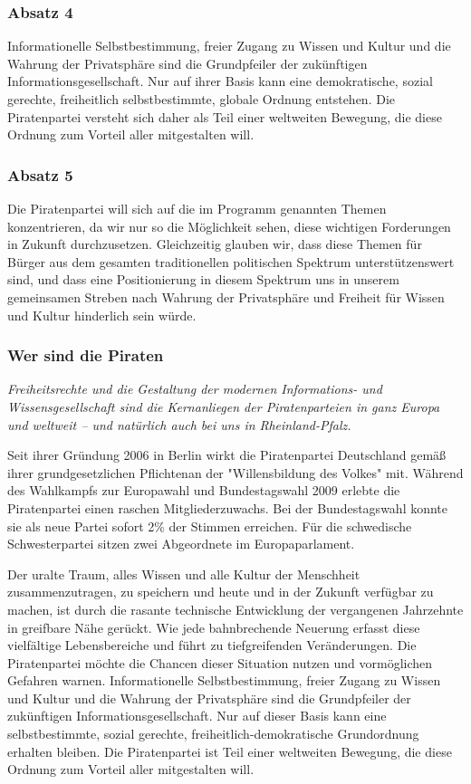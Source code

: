 \subsubsection{Absatz 4}
\abstimmung
Informationelle Selbstbestimmung, freier Zugang zu Wissen und Kultur und die Wahrung der Privatsphäre sind die Grundpfeiler der zukünftigen Informationsgesellschaft. Nur auf ihrer Basis kann eine demokratische, sozial gerechte, freiheitlich selbstbestimmte, globale Ordnung entstehen. Die Piratenpartei versteht sich daher als Teil einer weltweiten Bewegung, die diese Ordnung zum Vorteil aller mitgestalten will.
\subsubsection{Absatz 5}
\abstimmung
Die Piratenpartei will sich auf die im Programm genannten Themen konzentrieren, da wir nur so die Möglichkeit sehen, diese wichtigen Forderungen in Zukunft durchzusetzen. Gleichzeitig glauben wir, dass diese Themen für Bürger aus dem gesamten traditionellen politischen Spektrum unterstützenswert sind, und dass eine Positionierung in diesem Spektrum uns in unserem gemeinsamen Streben nach Wahrung der Privatsphäre und Freiheit für Wissen und Kultur hinderlich sein würde.

\label{praeambel:trier}
\subsubsection{Wer sind die Piraten}
\abstimmung
\textit{Freiheitsrechte und die Gestaltung der modernen Informations- und Wissensgesellschaft sind die Kernanliegen der Piratenparteien in ganz Europa und weltweit – und natürlich auch bei uns in Rheinland-Pfalz.}

Seit ihrer Gründung 2006 in Berlin wirkt die Piratenpartei Deutschland gemäß ihrer grundgesetzlichen Pflichtenan der "Willensbildung des Volkes" mit. Während des Wahlkampfs zur Europawahl und Bundestagswahl 2009 erlebte die Piratenpartei einen raschen Mitgliederzuwachs. Bei der Bundestagswahl konnte sie als neue Partei sofort 2\% der Stimmen erreichen. Für die schwedische Schwesterpartei sitzen zwei Abgeordnete im Europaparlament.

Der uralte Traum, alles Wissen und alle Kultur der Menschheit zusammenzutragen, zu speichern und heute und in der Zukunft verfügbar zu machen, ist durch die rasante technische Entwicklung der vergangenen Jahrzehnte in greifbare Nähe gerückt. Wie jede bahnbrechende Neuerung erfasst diese vielfältige Lebensbereiche und führt zu tiefgreifenden Veränderungen. Die Piratenpartei möchte die Chancen dieser Situation nutzen und vormöglichen Gefahren warnen.
Informationelle Selbstbestimmung, freier Zugang zu Wissen und Kultur und die Wahrung der Privatsphäre sind die Grundpfeiler der zukünftigen Informationsgesellschaft. Nur auf dieser Basis kann eine selbstbestimmte, sozial gerechte, freiheitlich-demokratische Grundordnung erhalten bleiben. Die Piratenpartei ist Teil einer weltweiten Bewegung, die diese Ordnung zum Vorteil aller mitgestalten will.

